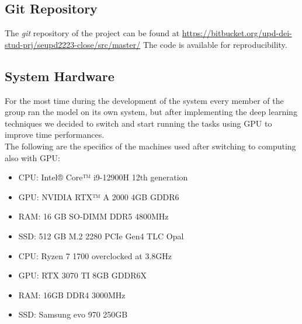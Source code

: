 \newpage
\subsection{Git Repository}
The \textit{git} repository of the project can be found at
\url{https://bitbucket.org/upd-dei-stud-prj/seupd2223-close/src/master/} The code is available for reproducibility.


\subsection{System Hardware}
For the most time during the development of the system every member of the group ran the model on its own system, but after implementing the deep learning techniques we decided to switch and start running the tasks using GPU to improve time performances. \\
The following are the specifics of the machines used after switching to computing also with GPU:
\begin{itemize}
	\item CPU: Intel® Core™ i9-12900H 12th generation
	\item GPU: NVIDIA RTX™ A 2000 4GB GDDR6
	\item RAM: 16 GB SO-DIMM DDR5 4800MHz
	\item SSD: 512 GB M.2 2280 PCIe Gen4 TLC Opal
\end{itemize}
\begin{itemize}
	\item CPU: Ryzen 7 1700 overclocked at 3.8GHz
	\item GPU: RTX 3070 TI 8GB GDDR6X
	\item RAM: 16GB  DDR4 3000MHz
	\item SSD: Samsung evo 970 250GB
\end{itemize}


